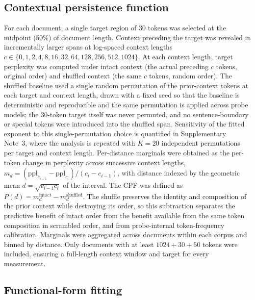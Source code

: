\documentclass[11pt]{article}
\begin{document}
\subsection{Contextual persistence function}

For each document, a single target region of 30 tokens was selected at the midpoint (50\%) of
document length. Context preceding the target was revealed in incrementally larger spans at
log-spaced context lengths $c \in \{0, 1, 2, 4, 8, 16, 32, 64, 128, 256, 512, 1024\}$. At each
context length, target perplexity was computed under intact context (the actual preceding $c$
tokens, original order) and shuffled context (the same $c$ tokens, random order). The shuffled
baseline used a single random permutation of the prior-context tokens at each target and context
length, drawn with a fixed seed so that the baseline is deterministic and reproducible and the same
permutation is applied across probe models; the 30-token target itself was never permuted, and no
sentence-boundary or special tokens were introduced into the shuffled span. Sensitivity of the
fitted exponent to this single-permutation choice is quantified in Supplementary Note~3, where the analysis is
repeated with $K=20$ independent permutations per target and context length. Per-distance
marginals were obtained as the per-token change in perplexity across successive context lengths,
$m_d = (\mathrm{ppl}_{c_{i-1}} - \mathrm{ppl}_{c_i}) / (c_i - c_{i-1})$, with distance indexed by
the geometric mean $d = \sqrt{c_{i-1} c_i}$ of the interval. The CPF was defined
as $P(d) = m_d^{\text{intact}} - m_d^{\text{shuffled}}$. The shuffle preserves the identity and
composition of the prior context while destroying its order, so this subtraction separates the
predictive benefit of intact order from the benefit available from the same token composition in
scrambled order, and from probe-internal token-frequency calibration. Marginals were aggregated across
documents within each corpus and binned by distance. Only documents with at least
$1024 + 30 + 50$ tokens were included, ensuring a full-length context window and target for every
measurement.

\subsection{Functional-form fitting}
\end{document}
